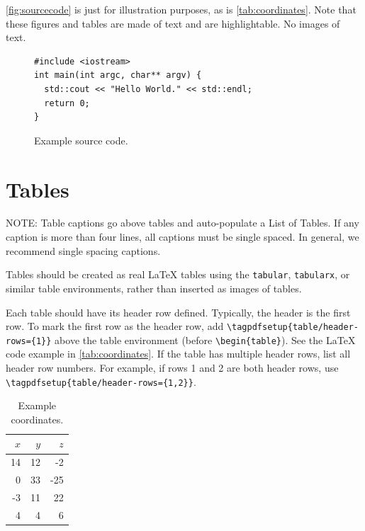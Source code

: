 \autoref{fig:sourcecode} is just for illustration purposes, as is \autoref{tab:coordinates}. Note that these figures and tables are made of text and are highlightable. No images of text. 


\begin{figure}[ht]
\begin{verbatim}
#include <iostream>
int main(int argc, char** argv) {
  std::cout << "Hello World." << std::endl;
  return 0;
}
\end{verbatim}
  \caption{Example source code.}
  \label{fig:sourcecode}
\end{figure}






\section{Tables}


NOTE: Table captions go above tables and auto-populate a List of Tables. 
If any caption is more than four lines, all captions must be single spaced. In general, we recommend single spacing captions. 

Tables should be created as real \LaTeX{} tables using the \verb|tabular|, \verb|tabularx|, or similar table environments, rather than inserted as images of tables.

Each table should have its header row defined. Typically, the header is the first row. To mark the first row as the header row, add \verb|\tagpdfsetup{table/header-rows={1}}| above the table environment (before \verb|\begin{table}|). See the \LaTeX{} code example in \autoref{tab:coordinates}.
If the table has multiple header rows, list all header row numbers. For example, if rows 1 and 2 are both header rows, use \verb|\tagpdfsetup{table/header-rows={1,2}}|.


\begin{table}[h]
  \centering
  \caption{Example coordinates.}
  \begin{tabular}{|rr|r|}
    \hline
    $x$ & $y$ & $z$ \\
    \hline
    14 & 12 & -2 \\
    0 & 33 & -25 \\
    -3 & 11 & 22 \\
    4 & 4 & 6 \\
    \hline
  \end{tabular}
  \label{tab:coordinates}
\end{table}

